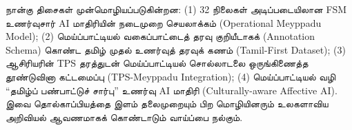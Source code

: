 \documentclass[journal,10pt,twocolumn]{IEEEtran}
\begin{document}
நான்கு திசைகள் முன்மொழியப்படுகின்றன: (1) 32 நிலைகள் அடிப்படையிலான FSM உணர்வுசார்
AI மாதிரியின் நடைமுறை செயலாக்கம் (Operational Meyppadu Model); (2)
மெய்ப்பாட்டியல் வகைப்பாட்டைத் தரவு குறியீடாகக் (Annotation Schema) கொண்ட தமிழ் முதல்
உணர்வுத் தரவுக் கணம் (Tamil-First Dataset); (3) ஆசிரியரின் TPS தரத்துடன்
மெய்ப்பாட்டியல் சொல்லாடலை ஒருங்கிணைத்த தூண்டுவினா கட்டமைப்பு (TPS-Meyppadu
Integration); (4) மெய்ப்பாட்டியல் வழி “தமிழ்ப் பண்பாட்டுச் சார்பு” உணர்வு AI
மாதிரி (Culturally-aware Affective AI). இவை தொல்காப்பியத்தை இளம் தலைமுறையும்
பிற மொழியினரும் உலகளாவிய அறிவியல் ஆவணமாகக் கொண்டாடும் வாய்ப்பை நல்கும்.


\nocite{*}


\end{document}
